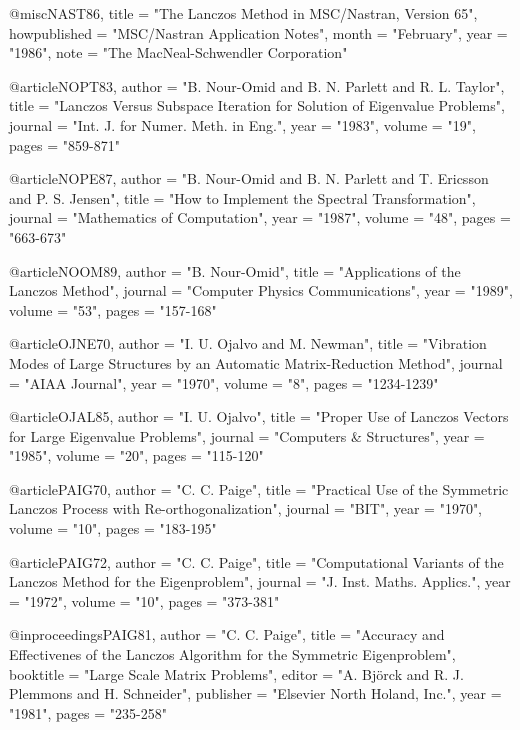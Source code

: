 @misc{NAST86,
   title        = "{The Lanczos Method in MSC/Nastran, Version 65}",
   howpublished = "MSC/Nastran Application Notes",
   month        = "February",
   year         = "1986",
   note         = "The MacNeal-Schwendler Corporation"}

@article{NOPT83,
   author       = "B. Nour-Omid and B. N. Parlett and R. L. Taylor",
   title        = "{Lanczos Versus Subspace Iteration for Solution
                   of Eigenvalue Problems}",
   journal      = "Int. J. for Numer. Meth. in Eng.",
   year         = "1983",
   volume       = "19",
   pages        = "859-871"}

@article{NOPE87,
   author       = "B. Nour-Omid and B. N. Parlett and
                   T. Ericsson and P. S. Jensen",
   title        = "{How to Implement the Spectral Transformation}",
   journal      = "Mathematics of Computation",
   year         = "1987",
   volume       = "48",
   pages        = "663-673"}

@article{NOOM89,
   author       = "B. Nour-Omid",
   title        = "{Applications of the Lanczos Method}",
   journal      = "Computer Physics Communications",
   year         = "1989",
   volume       = "53",
   pages        = "157-168"}

@article{OJNE70,
   author       = "I. U. Ojalvo and M. Newman",
   title        = "{Vibration Modes of Large Structures by an
                   Automatic Matrix-Reduction Method}",
   journal      = "AIAA Journal",
   year         = "1970",
   volume       = "8",
   pages        = "1234-1239"}

@article{OJAL85,
   author       = "I. U. Ojalvo",
   title        = "{Proper Use of Lanczos Vectors for Large
                   Eigenvalue Problems}",
   journal      = "Computers \& Structures",
   year         = "1985",
   volume       = "20",
   pages        = "115-120"}

@article{PAIG70,
   author       = "C. C. Paige",
   title        = "{Practical Use of the Symmetric Lanczos
                   Process with Re-orthogona\-lization}",
   journal      = "BIT",
   year         = "1970",
   volume       = "10",
   pages        = "183-195"}

@article{PAIG72,
   author       = "C. C. Paige",
   title        = "{Computational Variants of the Lanczos
                   Method for the Eigenproblem}",
   journal      = "J. Inst. Maths. Applics.",
   year         = "1972",
   volume       = "10",
   pages        = "373-381"}

@inproceedings{PAIG81,   
   author       = "C. C. Paige",
   title        = "{Accuracy and Effectivenes of the Lanczos Algorithm
                   for the Symmetric Eigenproblem}",
   booktitle    = "Large Scale Matrix Problems",
   editor       = "A. Bj{\"o}rck and R. J. Plemmons and H. Schneider",
   publisher    = "Elsevier North Holand, Inc.",
   year         = "1981",
   pages        = "235-258"}

